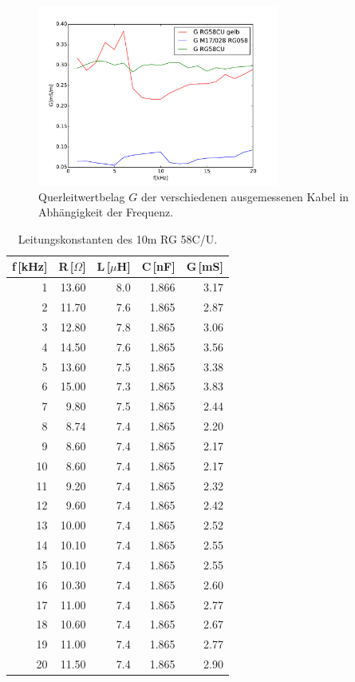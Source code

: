 \begin{figure}
\begin{minipage}{7.9cm}
		\label{fig_konst3}
	\end{minipage}
	\begin{minipage}{7.9cm}
		\includegraphics[width = 7.9cm]{data/a/G.pdf}
		\caption[]{Querleitwertbelag $G$ der verschiedenen ausgemessenen Kabel in Abhängigkeit der Frequenz.}
		\label{fig_konst4}
	\end{minipage}
\end{figure}

\begin{table}
\centering
	\caption[]{Leitungskonstanten des 10m RG 58C/U.}
	\begin{tabular}{r r r r r}
		f\,[kHz] & R\,[$\Omega$] & L\,[$\mu$H] & C\,[nF] & G\,[mS]\\
		\hline \hline
		  1	&	13.60	&	8.0	&	1.866	&	3.17\\
		  2	&	11.70	&	7.6	&	1.865	&	2.87\\
		  3	&	12.80	&	7.8	&	1.865	&	3.06\\
		  4	&	14.50	&	7.6	&	1.865	&	3.56\\
		  5	&	13.60	&	7.5	&	1.865	&	3.38\\
		  6	&	15.00	&	7.3	&	1.865	&	3.83\\
		  7	&	 9.80	&	7.5	&	1.865	&	2.44\\
		  8	&	 8.74	&	7.4	&	1.865	&	2.20\\
		  9	&	 8.60	&	7.4	&	1.865	&	2.17\\
		 10	&	 8.60	&	7.4	&	1.865	&	2.17\\
		 11	&	 9.20	&	7.4	&	1.865	&	2.32\\
		 12	&	 9.60	&	7.4	&	1.865	&	2.42\\
		 13	&	10.00	&	7.4	&	1.865	&	2.52\\
		 14	&	10.10	&	7.4	&	1.865	&	2.55\\
		 15	&	10.10	&	7.4	&	1.865	&	2.55\\
		 16	&	10.30	&	7.4	&	1.865	&	2.60\\
		 17	&	11.00	&	7.4	&	1.865	&	2.77\\
		 18	&	10.60	&	7.4	&	1.865	&	2.67\\
		 19	&	11.00	&	7.4	&	1.865	&	2.77\\
		 20	&	11.50	&	7.4	&	1.865	&	2.90\\
			\hline
	\end{tabular}
	\label{tab_konst1}
\end{table}

